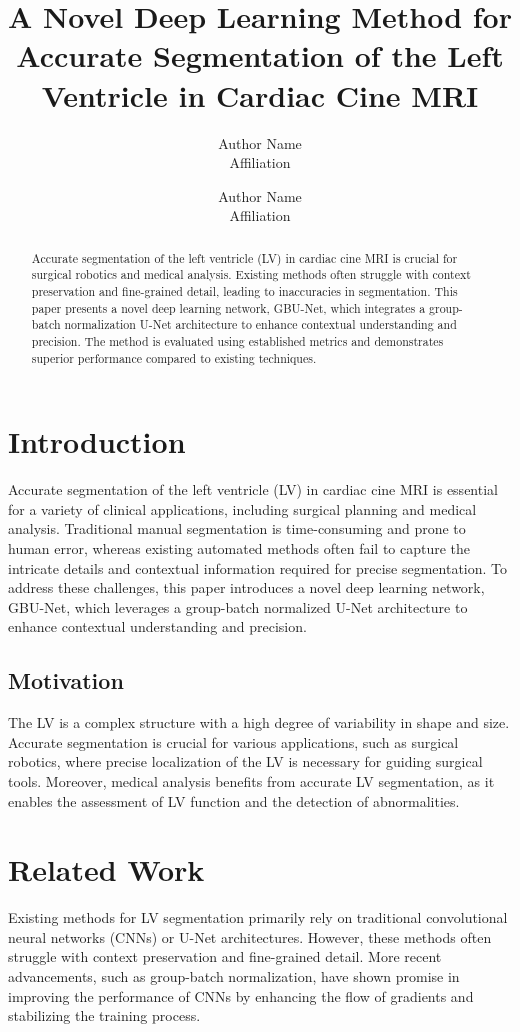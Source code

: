 \documentclass[11pt]{article}
\title{A Novel Deep Learning Method for Accurate Segmentation of the Left Ventricle in Cardiac Cine MRI}
\author{Author Name \\ Affiliation \\ \and Author Name \\ Affiliation}
\date{}
\begin{document}
\maketitle

\begin{abstract}
Accurate segmentation of the left ventricle (LV) in cardiac cine MRI is crucial for surgical robotics and medical analysis. Existing methods often struggle with context preservation and fine-grained detail, leading to inaccuracies in segmentation. This paper presents a novel deep learning network, GBU-Net, which integrates a group-batch normalization U-Net architecture to enhance contextual understanding and precision. The method is evaluated using established metrics and demonstrates superior performance compared to existing techniques.
\end{abstract}

\section{Introduction}
Accurate segmentation of the left ventricle (LV) in cardiac cine MRI is essential for a variety of clinical applications, including surgical planning and medical analysis. Traditional manual segmentation is time-consuming and prone to human error, whereas existing automated methods often fail to capture the intricate details and contextual information required for precise segmentation. To address these challenges, this paper introduces a novel deep learning network, GBU-Net, which leverages a group-batch normalized U-Net architecture to enhance contextual understanding and precision.

\subsection{Motivation}
The LV is a complex structure with a high degree of variability in shape and size. Accurate segmentation is crucial for various applications, such as surgical robotics, where precise localization of the LV is necessary for guiding surgical tools. Moreover, medical analysis benefits from accurate LV segmentation, as it enables the assessment of LV function and the detection of abnormalities.

\section{Related Work}
Existing methods for LV segmentation primarily rely on traditional convolutional neural networks (CNNs) or U-Net architectures. However, these methods often struggle with context preservation and fine-grained detail. More recent advancements, such as group-batch normalization, have shown promise in improving the performance of CNNs by enhancing the flow of gradients and stabilizing the training process.
\end{document}
